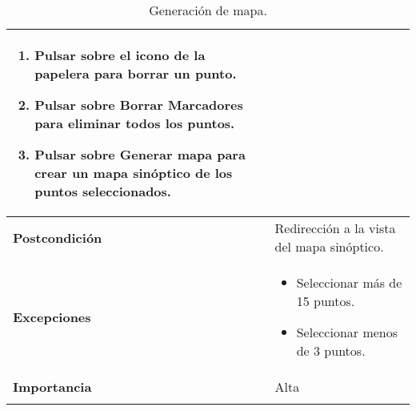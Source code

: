 \begin{longtable}[H]{@{}l|l@{}}
\begin{minipage}[t]{0.71\columnwidth}
\begin{enumerate}
			\item Pulsar sobre el icono de la papelera para borrar un punto.
			\item Pulsar sobre Borrar Marcadores para eliminar todos los puntos.
			\item Pulsar sobre Generar mapa para crear un mapa sinóptico de los puntos seleccionados.
		\end{enumerate}
	\end{minipage}\tabularnewline
	\midrule
	\begin{minipage}[t]{0.23\columnwidth}\raggedright\strut
		\textbf{Postcondición}\strut
	\end{minipage} & \begin{minipage}[t]{0.71\columnwidth}\raggedright\strut
		Redirección a la vista del mapa sinóptico.\strut
	\end{minipage}\tabularnewline
	\midrule
	\begin{minipage}[t]{0.23\columnwidth}\raggedright\strut
		\textbf{Excepciones}\strut
	\end{minipage} & \begin{minipage}[t]{0.71\columnwidth}\raggedright
		\begin{itemize}
			\tightlist
			\item Seleccionar más de 15 puntos.
			\item Seleccionar menos de 3 puntos.
		\end{itemize}
	\end{minipage}\tabularnewline
	\midrule
	\begin{minipage}[t]{0.23\columnwidth}\raggedright\strut
		\textbf{Importancia}\strut
	\end{minipage} & \begin{minipage}[t]{0.71\columnwidth}\raggedright\strut
		Alta\strut
	\end{minipage}\tabularnewline
	\bottomrule
	\caption{Generación de mapa.}
	\label{cu:2}
\end{longtable}
\newpage


